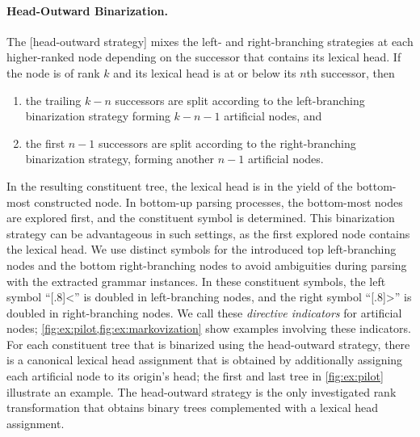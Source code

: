 \documentclass[../../document.tex]{subfiles}
\begin{document}
    \paragraph{Head-Outward Binarization.}
    The [head-outward strategy]  mixes the left- and right-branching strategies at each higher-ranked node depending on the successor that contains its lexical head.
    If the node is of rank \(k\) and its lexical head is at or below its \(n\)th successor, then
    \begin{enumerate}
        \item the trailing \(k-n\) successors are split according to the left-branching binarization strategy forming \(k-n-1\) artificial nodes, and
        \item the first \(n-1\) successors are split according to the right-branching binarization strategy, forming another \(n-1\) artificial nodes.
    \end{enumerate}
    In the resulting constituent tree, the lexical head is in the yield of the bottom-most constructed node.
    In bottom-up parsing processes, the bottom-most nodes are explored first, and the constituent symbol is determined.
    This binarization strategy can be advantageous in such settings, as the first explored node contains the lexical head.
    We use distinct symbols for the introduced top left-branching nodes and the bottom right-branching nodes to avoid ambiguities during parsing with the extracted grammar instances.
    In these constituent symbols, the left symbol ``\scalebox{.4}[.8]{\textless{}}'' is doubled in left-branching nodes, and the right symbol ``\scalebox{.4}[.8]{\textgreater{}}'' is doubled in right-branching nodes.
    We call these \emph{directive indicators} for artificial nodes; \cref{fig:ex:pilot,fig:ex:markovization} show examples involving these indicators.
    For each constituent tree that is binarized using the head-outward strategy, there is a canonical lexical head assignment that is obtained by additionally assigning each artificial node to its origin's head; the first and last tree in \cref{fig:ex:pilot} illustrate an example.
    The head-outward strategy is the only investigated rank transformation that obtains binary trees complemented with a lexical head assignment.
\end{document}
